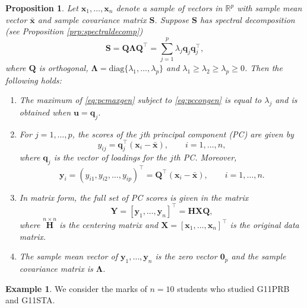 \documentclass[]{book}
\newtheorem{proposition}{Proposition}[chapter]
\theoremstyle{definition}
\theoremstyle{definition}
\newtheorem{example}{Example}[chapter]
\theoremstyle{definition}
\theoremstyle{remark}
\begin{document}
\begin{proposition}
\protect\hypertarget{prp:pca1}{}{\label{prp:pca1} }Let \(\boldsymbol x_1, \ldots , \boldsymbol x_n\) denote a sample of vectors in \(\mathbb{R}^p\) with sample mean vector \(\bar{\boldsymbol x}\) and sample covariance matrix \(\boldsymbol S\). Suppose \(\boldsymbol S\) has spectral decomposition (see Proposition \ref{prp:spectraldecomp})
\[
\boldsymbol S=\boldsymbol Q\boldsymbol \Lambda\boldsymbol Q^\top = \sum_{j=1}^p  \lambda_j \boldsymbol q_j \boldsymbol q_j^\top,
\]
where \(\boldsymbol Q\) is orthogonal, \(\boldsymbol \Lambda=\text{diag}\{\lambda_1, \ldots, \lambda_p\}\) and \(\lambda_1 \geq \lambda_2 \geq \lambda_p \geq 0\). Then the following holds:

\begin{enumerate}
\def\labelenumi{\arabic{enumi}.}
\item
  The maximum of \eqref{eq:pcmaxgen}
  subject to \eqref{eq:pccongen} is equal to \(\lambda_j\) and is obtained when \(\boldsymbol u=\boldsymbol q_j\).
\item
  For \(j=1, \ldots , p\), the scores of the \(j\)th principal component (PC) are given by
  \[
  y_{ij}=\boldsymbol q_j^\top(\boldsymbol x_i - \bar{\boldsymbol x}), \qquad i=1, \ldots , n,
  \]
  where \(\boldsymbol q_j\) is the vector of \emph{loadings} for the \(j\)th PC. Moreover,
  \[
  \boldsymbol y_i=( y_{i1}, y_{i2}, \ldots , y_{ip})^\top = \boldsymbol Q^\top (\boldsymbol x_i -\bar{\boldsymbol x}), \qquad i=1, \ldots ,n.
  \]
\item
  In matrix form, the full set of PC scores is given in the matrix
  \[
  \boldsymbol Y= [\boldsymbol y_1 , \ldots , \boldsymbol y_n]^\top =\boldsymbol H\boldsymbol X\boldsymbol Q,
  \]
  where \(\stackrel{n \times n}{\boldsymbol H}\) is the centering matrix and \(\boldsymbol X=[\boldsymbol x_1, \ldots , \boldsymbol x_n]^\top\) is the original data matrix.
\item
  The sample mean vector of \(\boldsymbol y_1, \ldots , \boldsymbol y_n\) is the zero vector \({\mathbf 0}_p\) and the sample covariance matrix is \(\boldsymbol \Lambda\).
\end{enumerate}
\end{proposition}

\begin{example}
\protect\hypertarget{exm:unnamed-chunk-1}{}{\label{exm:unnamed-chunk-1} }We consider the marks of \(n=10\) students who studied G11PRB and G11STA.
\end{example}
\end{document}
